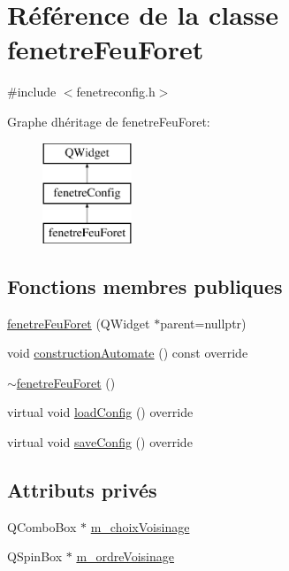 \hypertarget{classfenetre_feu_foret}{}\section{Référence de la classe fenetre\+Feu\+Foret}
\label{classfenetre_feu_foret}


{\ttfamily \#include $<$fenetreconfig.\+h$>$}

Graphe d\textquotesingle{}héritage de fenetre\+Feu\+Foret\+:\begin{figure}[H]
\begin{center}
\leavevmode
\includegraphics[height=3.000000cm]{classfenetre_feu_foret}
\end{center}
\end{figure}
\subsection*{Fonctions membres publiques}
\begin{DoxyCompactItemize}
\item 
\mbox{\hyperlink{classfenetre_feu_foret_a31576258d5cd4214d9a04d0735db5a70}{fenetre\+Feu\+Foret}} (Q\+Widget $\ast$parent=nullptr)
\item 
void \mbox{\hyperlink{classfenetre_feu_foret_a41d2078bf781a32157d526f623a55b28}{construction\+Automate}} () const override
\item 
\mbox{\hyperlink{classfenetre_feu_foret_a0dcccc1dc84cb39e97c50933265785c2}{$\sim$fenetre\+Feu\+Foret}} ()
\item 
virtual void \mbox{\hyperlink{classfenetre_feu_foret_a0a835b46bd202080341290a7fa784c4f}{load\+Config}} () override
\item 
virtual void \mbox{\hyperlink{classfenetre_feu_foret_a50d73cad62240b54640048cb254ddf13}{save\+Config}} () override
\end{DoxyCompactItemize}
\subsection*{Attributs privés}
\begin{DoxyCompactItemize}
\item 
Q\+Combo\+Box $\ast$ \mbox{\hyperlink{classfenetre_feu_foret_ac8c9731bc5722f246bda69ba593f7540}{m\+\_\+choix\+Voisinage}}
\item 
Q\+Spin\+Box $\ast$ \mbox{\hyperlink{classfenetre_feu_foret_a9be2039cf42d85e672b8505f60a53629}{m\+\_\+ordre\+Voisinage}}
\end{DoxyCompactItemize}
